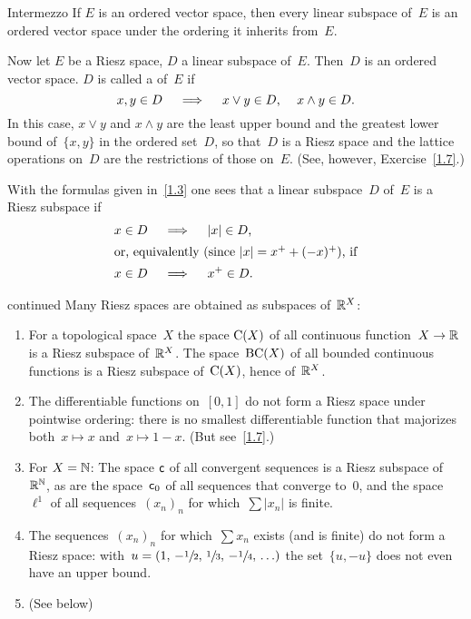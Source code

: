 \documentclass[main.tex]{subfiles}
\begin{document}
%
%
\begin{psec}{Intermezzo}
\label{1.6}
If $E$ is an ordered vector space, 
then every linear subspace of~$E$ is an ordered vector space
under the ordering it inherits from~$E$.

Now let $E$ be a Riesz space,
$D$ a linear subspace of~$E$.
Then~$D$ is an ordered vector space.
$D$ is called a  of~$E$
if
\begin{equation*}
x,y\in D \quad \implies \quad x\vee y\in D\textnormal{, }\quad x\wedge y\in D
\textnormal{.}
\end{equation*}
In this case,
$x\vee y$ and $x\wedge y$ are the least upper bound
and the greatest lower bound of~$\{x,y\}$ in the ordered set~$D$,
so that~$D$ is a Riesz space and the lattice operations on~$D$
are the restrictions of those on~$E$.
(See, however, Exercise~\ref{1.7}.)

With the formulas given in~\ref{1.3} one sees
that a linear subspace~$D$ of~$E$ is a Riesz subspace if
\begin{align*}
x\in D\quad &\implies \quad |x|\in D
\htam{,} \\ 
\intertext{%
or, 
equivalently
(since $|x|=x^+ + (-x)^+$), if}
x\in D \quad &\implies \quad x^+ \in D
\htam{.}
\end{align*}
\end{psec}
%
%
\begin{psec}[1.5]{continued}
\label{1.5_2}
Many Riesz spaces are obtained as subspaces of~$\mathbb{R}^X$:
\begin{enumerate}
\setcounter{enumi}{\value{list-1.5}}
\item
\label{1.5-3}
For a topological space~$X$ the space $\mathrm{C}(X)$
of all continuous function~$X\rightarrow\mathbb{R}$ is a Riesz subspace of~$\mathbb{R}^X$.
The space~$\mathrm{BC}(X)$ of all bounded continuous functions 
is a Riesz subspace of~$\mathrm{C}(X)$,
hence of~$\mathbb{R}^X$.
%
\item
\label{1.5-4}
The differentiable functions on~$[0,1]$ 
do not form a Riesz space
under pointwise ordering:
there is no smallest differentiable function
that majorizes both~$x\mapsto x$ and~$x\mapsto 1-x$.
(But see~\ref{1.7}.)
%
\item
\label{1.5-5}
For $X=\mathbb{N}$: 
The space $\mathsf{c}$ of all convergent sequences 
is a Riesz subspace of~$\mathbb{R}^{\mathbb{N}}$,
as are the space~$\mathsf{c}_0$
of all sequences that converge to~$0$,
and the space~$\ell^1$
of all sequences~$(x_n)_n$
for which~$\sum|x_n|$ is finite.
%
\item
\label{1.5-6}
The sequences~$(x_n)_n$ for which~$\sum x_n$ exists (and is finite)
do not form a Riesz space:
with~$u=(1,\,-\sfrac{1}{2},\, \sfrac{1}{3},\, -\sfrac{1}{4},\, \ldots)$
the set~$\{u,-u\}$
does not even have an upper bound.
%
\setcounter{list-1.5}{\value{enumi}}
\item
(See below)
\end{enumerate}
\end{psec}
\end{document}
